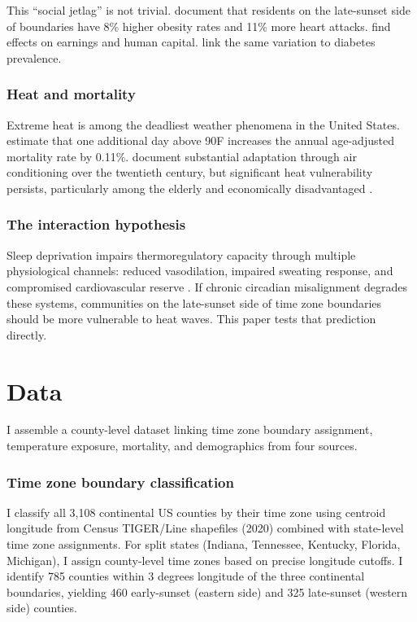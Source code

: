 \documentclass[12pt]{article}
\begin{document}
This ``social jetlag'' is not trivial. \citet{giuntella2019sunset} document that residents on the late-sunset side of boundaries have 8\% higher obesity rates and 11\% more heart attacks. \citet{jin2021time} find effects on earnings and human capital. \citet{costa2023circadian} link the same variation to diabetes prevalence.

\subsubsection*{Heat and mortality} Extreme heat is among the deadliest weather phenomena in the United States. \citet{deschenes2011climate} estimate that one additional day above 90\textdegree{}F increases the annual age-adjusted mortality rate by 0.11\%. \citet{barreca2016adapting} document substantial adaptation through air conditioning over the twentieth century, but significant heat vulnerability persists, particularly among the elderly and economically disadvantaged \citep{carleton2022valuing}.

\subsubsection*{The interaction hypothesis} Sleep deprivation impairs thermoregulatory capacity through multiple physiological channels: reduced vasodilation, impaired sweating response, and compromised cardiovascular reserve \citep{lack2008sleep, okamoto2012effects}. If chronic circadian misalignment degrades these systems, communities on the late-sunset side of time zone boundaries should be more vulnerable to heat waves. This paper tests that prediction directly.


\section{Data}
\label{sec:data}

I assemble a county-level dataset linking time zone boundary assignment, temperature exposure, mortality, and demographics from four sources.

\subsubsection*{Time zone boundary classification} I classify all 3,108 continental US counties by their time zone using centroid longitude from Census TIGER/Line shapefiles (2020) combined with state-level time zone assignments. For split states (Indiana, Tennessee, Kentucky, Florida, Michigan), I assign county-level time zones based on precise longitude cutoffs. I identify 785 counties within 3 degrees longitude of the three continental boundaries, yielding 460 early-sunset (eastern side) and 325 late-sunset (western side) counties.
\end{document}
